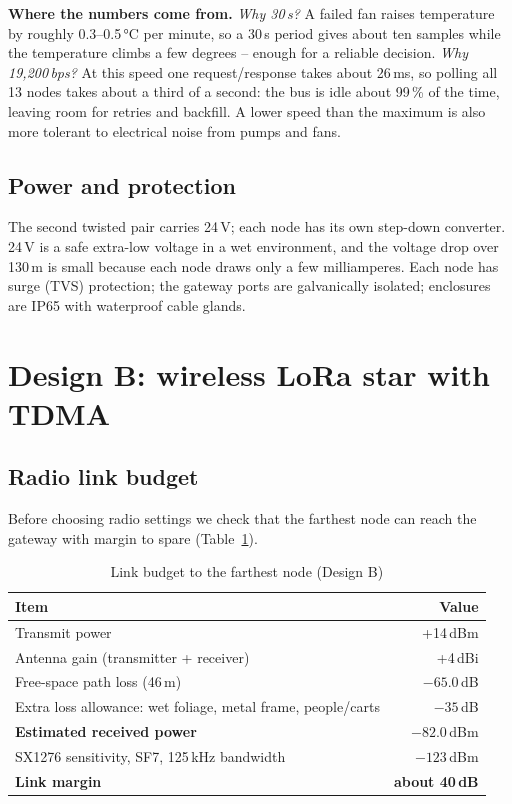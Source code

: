 \documentclass[11pt,a4paper]{report}
\newcommand{\why}[1]{\par\noindent\colorbox{gray!10}{\parbox{\dimexpr\linewidth-2\fboxsep}{\small\textbf{Where the numbers come from.} #1}}\par}
\begin{document}
\why{\emph{Why 30\,s?} A failed fan raises temperature by roughly 0.3--0.5\,°C per minute, so a 30\,s period gives about ten samples while the temperature climbs a few degrees -- enough for a reliable decision. \emph{Why 19{,}200\,bps?} At this speed one request/response takes about 26\,ms, so polling all 13 nodes takes about a third of a second: the bus is idle about 99\,\% of the time, leaving room for retries and backfill. A lower speed than the maximum is also more tolerant to electrical noise from pumps and fans.}

\subsection{Power and protection}
The second twisted pair carries 24\,V; each node has its own step-down converter. 24\,V is a safe extra-low voltage in a wet environment, and the voltage drop over 130\,m is small because each node draws only a few milliamperes. Each node has surge (TVS) protection; the gateway ports are galvanically isolated; enclosures are IP65 with waterproof cable glands.

\section{Design B: wireless LoRa star with TDMA}
\subsection{Radio link budget}
Before choosing radio settings we check that the farthest node can reach the gateway with margin to spare (Table~\ref{tab:link}).

\begin{table}[htbp]
\centering
\caption{Link budget to the farthest node (Design B)}\label{tab:link}
\small
\begin{tabular}{l r}
\toprule
\textbf{Item} & \textbf{Value}\\
\midrule
Transmit power & +14\,dBm\\
Antenna gain (transmitter + receiver) & +4\,dBi\\
Free-space path loss (46\,m) & $-65.0$\,dB\\
Extra loss allowance: wet foliage, metal frame, people/carts & $-35$\,dB\\
\textbf{Estimated received power} & $\mathbf{-82.0}$\,dBm\\
SX1276 sensitivity, SF7, 125\,kHz bandwidth & $-123$\,dBm\\
\textbf{Link margin} & \textbf{about 40\,dB}\\
\bottomrule
\end{tabular}
\end{table}
\end{document}
